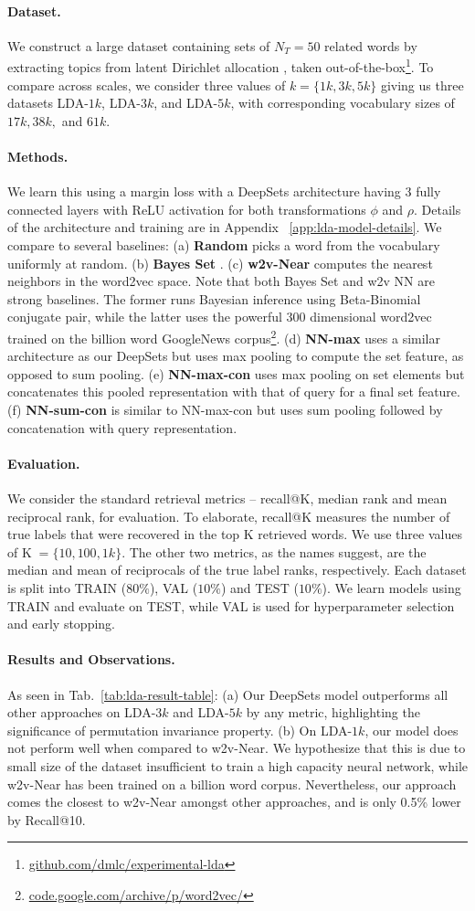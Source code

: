 \documentclass{article}
\newcommand{\compactparagraph}[1]{\vspace*{-10pt}\paragraph{#1}}
\newcommand{\refapp}[1]{Appendix ~\ref{#1}}
\newcommand{\reftab}[1]{Tab.~\ref{#1}}
\newcommand{\deepsets}{DeepSets\xspace}
\begin{document}
\compactparagraph{Dataset.}
We construct a large dataset containing sets of $N_T=50$ related words by extracting topics from latent Dirichlet allocation \cite{Pritchard945, Blei03latentdirichlet}, taken out-of-the-box\footnote{\url{github.com/dmlc/experimental-lda}}. To compare across scales, we consider three values of $k=\{1k, 3k, 5k\}$ giving us three datasets LDA-$1k$, LDA-$3k$, and LDA-$5k$, with corresponding vocabulary sizes of $17k, 38k,$ and $61k$.

\compactparagraph{Methods.}
We learn this using a margin loss with a \deepsets architecture having 3 fully connected layers with ReLU activation for both transformations $\phi$ and $\rho$. Details of the architecture and training are in \refapp{app:lda-model-details}. We compare to several baselines:
(a) \textbf{Random} picks a word from the vocabulary uniformly at random.
(b) \textbf{Bayes Set} \cite{ghahramani2005bayesian}.
(c) \textbf{w2v-Near} computes the nearest neighbors in the word2vec \cite{mikolov2013distributed} space.
Note that both Bayes Set and w2v NN are strong baselines.
The former runs Bayesian inference using Beta-Binomial conjugate pair, while the latter uses the powerful $300$ dimensional word2vec trained on the billion word GoogleNews corpus\footnote{\url{code.google.com/archive/p/word2vec/}}.
(d) \textbf{NN-max} uses a similar architecture as our \deepsets but uses max pooling to compute the set feature, as opposed to sum pooling.
(e) \textbf{NN-max-con} uses max pooling on set elements but concatenates this pooled representation with that of query for a final set feature.
(f) \textbf{NN-sum-con} is similar to NN-max-con but uses sum pooling followed by concatenation with query representation.

\compactparagraph{Evaluation.}
We consider the standard retrieval metrics -- recall@K, median rank and mean reciprocal rank, for evaluation.
To elaborate, recall@K measures the number of true labels that were recovered in the top K retrieved words. We use three values of K$\;=\{10, 100, 1k\}$. The other two metrics, as the names suggest, are the median and mean of reciprocals of the true label ranks, respectively. Each dataset is split into TRAIN ($80\%$), VAL ($10\%$) and TEST ($10\%$). We learn models using TRAIN and evaluate on TEST, while VAL is used for hyperparameter selection and early stopping.

\compactparagraph{Results and Observations.}
As seen in \reftab{tab:lda-result-table}: (a) Our \deepsets model outperforms all other approaches on LDA-$3k$ and LDA-$5k$ by any metric, highlighting the significance of permutation invariance property. (b) On LDA-$1k$, our model does not perform well when compared to w2v-Near. We hypothesize that this is due to small size of the dataset insufficient to train a high capacity neural network, while w2v-Near has been trained on a billion word corpus. Nevertheless, our approach comes the closest to w2v-Near amongst other approaches, and is only 0.5\% lower by Recall@10.
\end{document}
